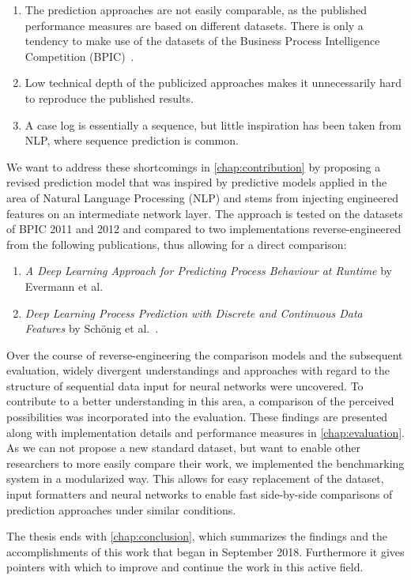 \begin{enumerate}
    \item The prediction approaches are not easily comparable, as the published performance measures are based on different datasets. There is only a tendency to make use of the datasets of the Business Process Intelligence Competition (BPIC)~\cite{BPIC2011, BPIC2012, BPIC2017}.
    \item Low technical depth of the publicized approaches makes it unnecessarily hard to reproduce the published results.
    \item A case log is essentially a sequence, but little inspiration has been taken from NLP, where sequence prediction is common.
\end{enumerate}

We want to address these shortcomings in \autoref{chap:contribution} by proposing a revised prediction model that was inspired by predictive models applied in the area of Natural Language Processing (NLP) and stems from injecting engineered features on an intermediate network layer. The approach is tested on the datasets of BPIC 2011 and 2012 and compared to two implementations reverse-engineered from the following publications, thus allowing for a direct comparison:

\begin{enumerate}
    \item \textit{A Deep Learning Approach for Predicting Process Behaviour at Runtime} by Evermann et al.~\cite{evermann2016} \item\textit{Deep Learning Process Prediction with Discrete and Continuous Data Features} by Schönig et al.~\cite{schoenig2018}.
\end{enumerate}

Over the course of reverse-engineering the comparison models and the subsequent evaluation, widely divergent understandings and approaches with regard to the structure of sequential data input for neural networks were uncovered. To contribute to a better understanding in this area, a comparison of the perceived possibilities was incorporated into the evaluation. These findings are presented along with implementation details and performance measures in \autoref{chap:evaluation}. As we can not propose a new standard dataset, but want to enable other researchers to more easily compare their work, we implemented the benchmarking system in a modularized way. This allows for easy replacement of the dataset, input formatters and neural networks to enable fast side-by-side comparisons of prediction approaches under similar conditions.

The thesis ends with \autoref{chap:conclusion}, which summarizes the findings and the accomplishments of this work that began in September 2018. Furthermore it gives pointers with which to improve and continue the work in this active field.